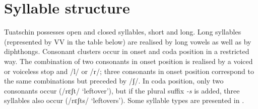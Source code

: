 \section{Syllable structure}
Tuatschin possesses open and closed syllables, short and long. Long syllables (represented by VV in the table below) are realised by long vowels as well as by diphthongs. Consonant clusters occur in onset and coda position in a restricted way. The combination of two consonants in onset position is realised by a voiced or voiceless stop and /l/ or /r/; three consonants in onset position correspond to the same combinations but preceded by /ʃ/. In coda position, only two consonants occur (/rɛʃt/ `leftover'), but if the plural suffix \mbox{\textit{-s}} is added, three syllables also occur (/rɛʃts/ `leftovers'). Some syllable types are presented in .

